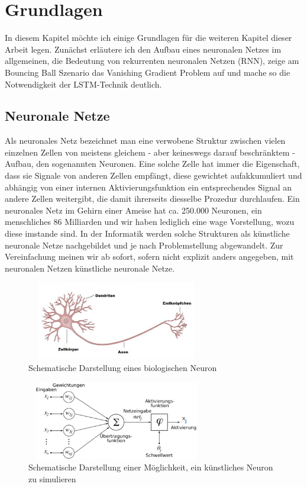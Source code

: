 \chapter{Grundlagen} 
\label{ch:grundlagen}
In diesem Kapitel möchte ich einige Grundlagen für die weiteren Kapitel dieser Arbeit legen. Zunächst erläutere ich den Aufbau eines neuronalen Netzes im allgemeinen, die Bedeutung von rekurrenten neuronalen Netzen (RNN), zeige am Bouncing Ball Szenario das Vanishing Gradient Problem auf und mache so die Notwendigkeit der LSTM-Technik deutlich.
\section{Neuronale Netze}
Als neuronales Netz bezeichnet man eine verwobene Struktur zwischen vielen einzelnen Zellen von meistens gleichem - aber keineswegs darauf beschr\"anktem - Aufbau, den sogenannten Neuronen. Eine solche Zelle hat immer die Eigenschaft, dass sie Signale von anderen Zellen empfängt, diese gewichtet aufakkumuliert und abhängig von einer internen Aktivierungsfunktion ein entsprechendes Signal an andere Zellen weitergibt, die damit ihrerseits diesselbe Prozedur durchlaufen. Ein neuronales Netz im Gehirn einer Ameise hat ca. 250.000 Neuronen, ein menschliches 86 Milliarden \cite{bib:number} und wir haben lediglich eine wage Vorstellung, wozu diese imstande sind. In der Informatik werden solche Strukturen als künstliche neuronale Netze nachgebildet und je nach Problemstellung abgewandelt. Zur Vereinfachung meinen wir ab sofort, sofern nicht explizit anders angegeben, mit neuronalen Netzen künstliche neuronale Netze.
\begin{figure}
	\centering
	\includegraphics[width=0.7\textwidth, height=130px]{pics/neuron.jpg}	
	\caption{Schematische Darstellung eines biologischen Neuron \cite{bib:neuron}}
	\label{img:neuron}
\end{figure}
\begin{figure}
	\centering
	\includegraphics[width=0.7\textwidth, height=130px]{pics/aneuron.png}	
	\caption{Schematische Darstellung einer Möglichkeit, ein künstliches Neuron zu simulieren \cite{bib:aneuron}}
	\label{img:aneuron}
\end{figure}
